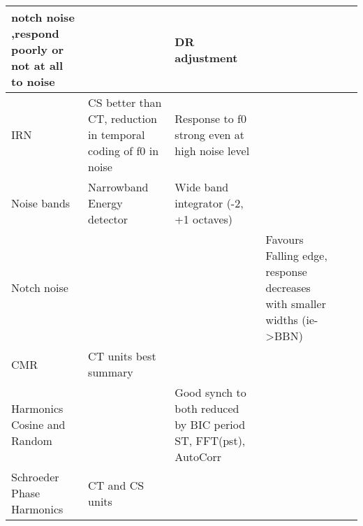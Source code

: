 \documentclass[10pt,a4paper]{article}
\begin{document}
\begin{flushleft}
\begin{supertabular}{|m{3.9609997cm}|m{2.9099998cm}|m{2.8739998cm}|m{2.846cm}|m{2.836cm}|m{2.839cm}|}
\citep{SpirouDavisEtAl:1999}notch noise \citep{ReissYoung:2005} ,respond
           poorly or not at all to noise \citep{Rhode:1999}             &                                                                          & DR adjustment
\citep{GibsonYoungEtAl:1985}\\\hline
                                  IRN                                   & CS better than CT, reduction in
temporal coding of f0 in noise
\citep{WiegrebeKrumbholz:1999,WiegrebeWinter:2001,WinterPalmerEtAl:2003;WinterWiegrebeEtAl:2001}
                                                                        & Response to f0 strong even at high noise level
                     \citep{WinterPalmerEtAl:2003}                      &                                                                          & & \\\hline
                              Noise bands                               & Narrowband Energy
                 detector \citep{PalmerJiangEtAl:1996}                  & Wide band integrator (-2, +1
                 octaves) \citep{PalmerJiangEtAl:1996}                  &                                                                          & & \\\hline
                              Notch noise                               &                                                                          & & 
Favours Falling edge, response decreases with smaller widths
    (ie-{\textgreater}BBN) \citep{NelkenYoung:1994,ReissYoung:2005}     &                                                                          & \\\hline
                                  CMR                                   & CT units best \citep{PressnitzerMeddisEtAl:2001} summary
                  \citep{VerheyPressnitzerEtAl:2003}                    &                                                                          & & & \\\hline
Harmonics Cosine and
                                Random                                  &                                                                          & Good synch to both reduced by BIC\citep{EvansZhao:1998}
        \citep{PalmerWinter:1993} period ST, FFT(pst), AutoCorr         &                                                                          & & 

\\\hline
                       Schroeder Phase Harmonics                        &                    CT and CS units \citep{Recio:2001}                    & & 
                                                                        &                                                                          & 


\end{supertabular}
\end{flushleft}
\end{document}
